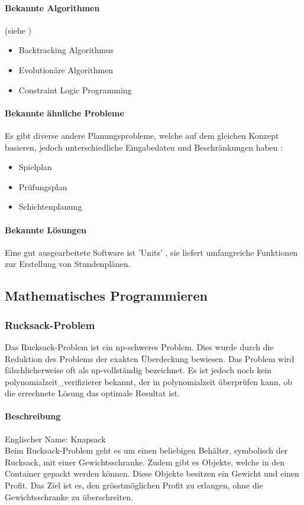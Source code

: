 	\paragraph{Bekannte Algorithmen}
	(siehe \cite{framework_timetabling})
	\begin{itemize}
		\item Backtracking Algorithmus
		\item Evolutionäre Algorithmen
		\item Constraint Logic Programming
	\end{itemize}	

	\paragraph{Bekannte ähnliche Probleme}	
	Es gibt diverse andere Planungsprobleme, welche auf dem gleichen Konzept basieren, jedoch unterschiedliche Eingabedaten und Beschränkungen haben \cite{framework_timetabling}:
	\begin{itemize}
		\item Spielplan
		\item Prüfungsplan
		\item Schichtenplanung
	\end{itemize}

	\paragraph{Bekannte Lösungen}		
	Eine gut ausgearbeitete Software ist 'Units' \cite{unit_express}, sie liefert umfangreiche Funktionen zur Erstellung von Stundenplänen.

\subsection{Mathematisches Programmieren}\label{mathematical_programming}

	\subsubsection{Rucksack-Problem}\label{knapsack}
	Das Rucksack-Problem ist ein \gls{np}-schweres Problem. Dies wurde durch die Reduktion des Problems der exakten Überdeckung bewiesen. Das Problem wird fälschlicherweise oft als 
	\gls{np}-vollständig bezeichnet. Es ist jedoch noch kein \gls{polynomialzeit_verifizierer} bekannt, der in \gls{polynomialzeit} überprüfen kann, ob die errechnete Lösung das optimale Resultat 
	ist.

	\paragraph{Beschreibung}
	Englischer Name: Knapsack\\
	Beim Rucksack-Problem geht es um einen beliebigen Behälter, symbolisch der Rucksack, mit einer Gewichtsschranke. Zudem gibt es Objekte, welche in den Container gepackt werden 
	können. Diese Objekte besitzen ein Gewicht und einen Profit. Das Ziel ist es, den grösstmöglichen Profit zu erlangen, ohne die Gewichtsschranke zu überschreiten. 
	\cite{knapsack_desc_web}


